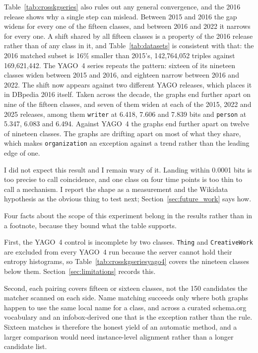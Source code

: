 Table~\ref{tab:crosskgseries} also rules out any general convergence, and the
2016 release shows why a single step can mislead. Between 2015 and 2016 the gap
widens for every one of the fifteen classes, and between 2016 and 2022 it narrows
for every one. A shift shared by all fifteen classes is a property of the 2016
release rather than of any class in it, and Table~\ref{tab:datasets} is
consistent with that: the 2016 matched subset is 16\% smaller than 2015's,
142{,}764{,}052 triples against 169{,}621{,}442. The YAGO~4 series repeats the
pattern: sixteen of its nineteen classes widen between 2015 and 2016, and
eighteen narrow between 2016 and 2022. The shift now appears against two
different YAGO releases, which places it in DBpedia 2016 itself. Taken across the decade, the
graphs end further apart on nine of the fifteen classes, and seven of them widen
at each of the 2015, 2022 and 2025 releases, among them \texttt{writer} at
6.418, 7.606 and 7.839 bits and \texttt{person} at 5.347, 6.083 and 6.494. Against YAGO~4 the graphs end further apart on twelve of nineteen classes. The
graphs are drifting apart on most of what they share, which makes
\texttt{organization} an exception against a trend rather than the leading edge
of one.

I did not expect this result and I remain wary of it. Landing within 0.0001 bits
is too precise to call coincidence, and one class on four time points is too
thin to call a mechanism. I report the shape as a measurement and the Wikidata
hypothesis as the obvious thing to test next; Section~\ref{sec:future_work}
says how.

Four facts about the scope of this experiment belong in the results rather
than in a footnote, because they bound what the table supports.

First, the YAGO~4 control is incomplete by two classes. \texttt{Thing} and
\texttt{CreativeWork} are excluded from every YAGO~4 run because the server
cannot hold their entropy histograms, so Table~\ref{tab:crosskgseriesyago4}
covers the nineteen classes below them. Section~\ref{sec:limitations} records
this.

Second, each pairing covers fifteen or sixteen classes, not the 150 candidates
the matcher scanned on each side. Name matching succeeds only where both graphs
happen to use the same local name for a class, and across a curated schema.org
vocabulary and an infobox-derived one that is the exception rather than the
rule. Sixteen matches is therefore the honest yield of an automatic method, and a
larger comparison would need instance-level alignment rather than a longer
candidate list.

